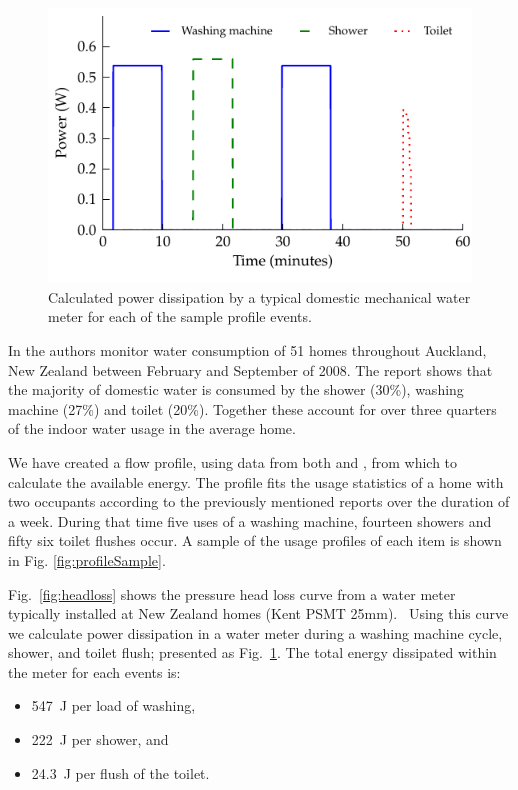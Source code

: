 \documentclass[10pt,final,journal]{IEEEtran}
\begin{document}
    \begin{figure}
        \begin{center}
        \includegraphics[width=\linewidth]{graph_harvest}
        \end{center}
        \caption{Calculated power dissipation by a typical domestic mechanical water meter for each of the sample profile events.}
        \label{fig:powerDissipated_meter}
    \end{figure}


    In \cite{Heinrich2008} the authors monitor water consumption of 51 homes throughout Auckland, New Zealand between February and September of 2008.
    The report shows that the majority of domestic water is consumed by the shower (30\%), washing machine (27\%) and toilet (20\%).
    Together these account for over three quarters of the indoor water usage in the average home.
    
    We have created a flow profile, using data from both \cite{Heinrich2008} and \cite{Heinrich2007}, from which to calculate the available energy.
    The profile fits the usage statistics of a home with two occupants according to the previously mentioned reports over the duration of a week.
    During that time five uses of a washing machine, fourteen showers and fifty six toilet flushes occur.
    A sample of the usage profiles of each item is shown in Fig. \ref{fig:profileSample}.

    Fig.~\ref{fig:headloss} shows the pressure head loss curve from a water meter typically installed at New Zealand homes (Kent PSMT 25mm).~\cite{WatercareNewZealand2014}
    Using this curve we calculate power dissipation in a water meter during a washing machine cycle, shower, and toilet flush; presented as Fig.~\ref{fig:powerDissipated_meter}.
    The total energy dissipated within the meter for each events is:
    \begin{itemize}
    \item \SI{547}{\joule} per load of washing,
    \item \SI{222}{\joule} per shower, and
    \item \SI{24.3}{\joule} per flush of the toilet.
    \end{itemize}
\end{document}

